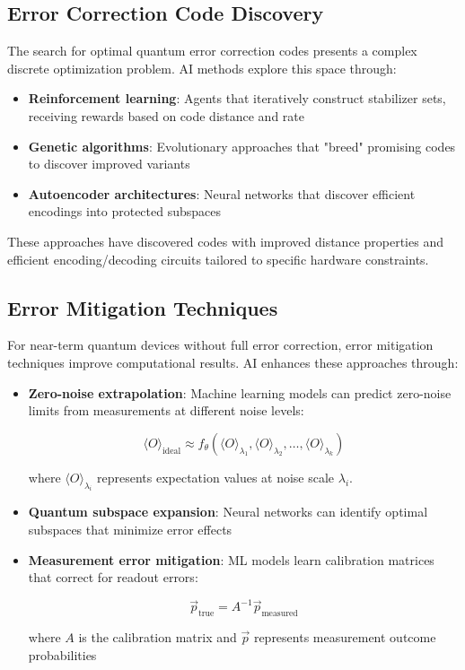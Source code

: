 \subsection{Error Correction Code Discovery}
The search for optimal quantum error correction codes presents a complex discrete optimization problem. AI methods explore this space through:

\begin{itemize}
    \item \textbf{Reinforcement learning}: Agents that iteratively construct stabilizer sets, receiving rewards based on code distance and rate
    
    \item \textbf{Genetic algorithms}: Evolutionary approaches that "breed" promising codes to discover improved variants
    
    \item \textbf{Autoencoder architectures}: Neural networks that discover efficient encodings into protected subspaces
\end{itemize}

These approaches have discovered codes with improved distance properties and efficient encoding/decoding circuits tailored to specific hardware constraints.

\subsection{Error Mitigation Techniques}
For near-term quantum devices without full error correction, error mitigation techniques improve computational results. AI enhances these approaches through:

\begin{itemize}
    \item \textbf{Zero-noise extrapolation}: Machine learning models can predict zero-noise limits from measurements at different noise levels:
    
    \begin{equation}
    \langle O \rangle_{\text{ideal}} \approx f_\theta(\langle O \rangle_{\lambda_1}, \langle O \rangle_{\lambda_2}, \ldots, \langle O \rangle_{\lambda_k})
    \end{equation}
    
    where $\langle O \rangle_{\lambda_i}$ represents expectation values at noise scale $\lambda_i$.
    
    \item \textbf{Quantum subspace expansion}: Neural networks can identify optimal subspaces that minimize error effects
    
    \item \textbf{Measurement error mitigation}: ML models learn calibration matrices that correct for readout errors:
    
    \begin{equation}
    \vec{p}_{\text{true}} = A^{-1} \vec{p}_{\text{measured}}
    \end{equation}
    
    where $A$ is the calibration matrix and $\vec{p}$ represents measurement outcome probabilities
\end{itemize}

